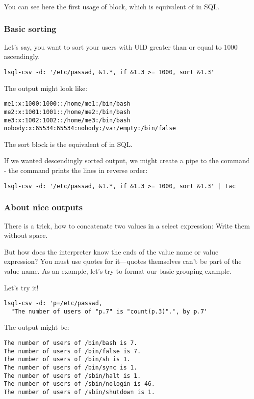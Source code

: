 You can see here the first usage of  block, which is equivalent of  in SQL.

\subsubsection{Basic sorting}
Let's say, you want to sort your users with UID greater than or equal to 1000 ascendingly.
\begin{verbatim}
lsql-csv -d: '/etc/passwd, &1.*, if &1.3 >= 1000, sort &1.3'
\end{verbatim}
The output might look like:
\begin{verbatim}
me1:x:1000:1000::/home/me1:/bin/bash
me2:x:1001:1001::/home/me2:/bin/bash
me3:x:1002:1002::/home/me3:/bin/bash
nobody:x:65534:65534:nobody:/var/empty:/bin/false
\end{verbatim}

The sort block is the equivalent of  in SQL.

If we wanted descendingly sorted output, we might create a pipe to the  command - the  command prints the lines in reverse order:
\begin{verbatim}
lsql-csv -d: '/etc/passwd, &1.*, if &1.3 >= 1000, sort &1.3' | tac
\end{verbatim}

\subsubsection{About nice outputs}
There is a trick, how to concatenate two values in a select expression: Write them without space.

But how does the interpreter know the ends of the value name or value expression? You must use quotes for it---quotes themselves can't be part of the value name.
As an example, let's try to format our basic grouping example.

Let's try it!
\begin{verbatim}
lsql-csv -d: 'p=/etc/passwd, 
  "The number of users of "p.7" is "count(p.3)".", by p.7'
\end{verbatim}
The output might be:
\begin{verbatim}
The number of users of /bin/bash is 7.
The number of users of /bin/false is 7.
The number of users of /bin/sh is 1.
The number of users of /bin/sync is 1.
The number of users of /sbin/halt is 1.
The number of users of /sbin/nologin is 46.
The number of users of /sbin/shutdown is 1.
\end{verbatim}

